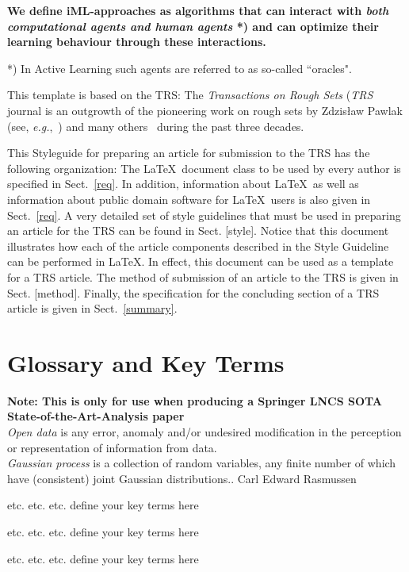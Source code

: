 \documentclass{llncs}
\begin{document}
\textbf{We define iML-approaches as algorithms that can interact with \textit{both computational agents and human agents} *) and can optimize their learning behaviour through these interactions.} \cite{Holzinger:2016:iML}

*) In Active Learning such agents are referred to as so-called ``oracles".

This template is based on the TRS: The {\it Transactions on Rough Sets} ({\em TRS} journal is an outgrowth of the pioneering work on rough sets by Zdzis{\l}aw Pawlak (see, {\em e.g.},~\cite{rs0,rs1,rs2,rs3,objects,RS}) and many others~\cite{RSDS} during the past three decades.

This Styleguide for preparing an article for submission to the TRS has the following organization:  The \LaTeX~document class to be used by every author is specified in Sect.~\ref{req}.  In addition, information about \LaTeX~as well as information about public domain software for \LaTeX~users is also given in Sect.~\ref{req}.  A very detailed set of style guidelines that must be used in preparing an article for the TRS can be found in Sect. [style].  Notice that this document illustrates how each of the article components described in the Style Guideline can be performed in \LaTeX.  In effect, this document can be used as a template for a TRS article. The method of submission of an article to the TRS is given in Sect. [method]. Finally, the specification for the concluding section of a TRS article is given in Sect.~\ref{summary}.

\section{Glossary and Key Terms}

\textbf{Note: This is only for use when producing a Springer LNCS SOTA State-of-the-Art-Analysis paper}
\\[0,2cm]
\emph{Open data} is any error, anomaly and/or undesired modification in the perception or representation of information from data.
\\[0,2cm]
\emph{Gaussian process} is a collection of random variables, any finite number of which have (consistent) joint Gaussian distributions..
Carl Edward Rasmussen

etc.
etc.
etc.
define your key terms here

etc.
etc.
etc.
define your key terms here

etc.
etc.
etc.
define your key terms here
\end{document}
